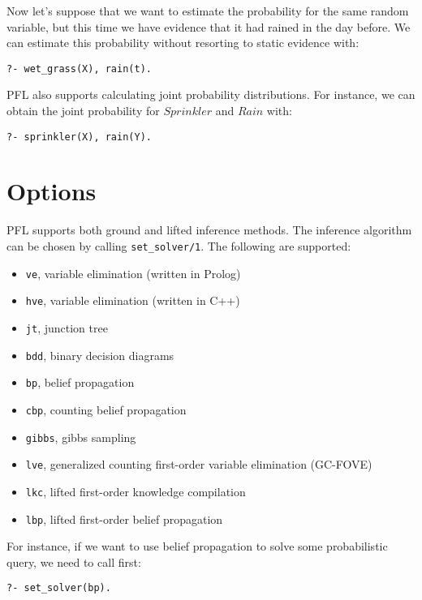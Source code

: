 \documentclass{article}
\begin{document}
Now let's suppose that we want to estimate the probability for the same random variable, but this time we have evidence that it had rained in the day before. We can estimate this probability without resorting to static evidence with:

\texttt{?- wet\_grass(X), rain(t).}

PFL also supports calculating joint probability distributions. For instance, we can obtain the joint probability for $Sprinkler$ and $Rain$ with:

\texttt{?- sprinkler(X), rain(Y).}



\section{Options}
PFL supports both ground and lifted inference methods. The inference algorithm can be chosen by calling \texttt{set\_solver/1}. The following are supported:
\begin{itemize}
 \item \texttt{ve},  variable elimination (written in Prolog)
 \item \texttt{hve}, variable elimination (written in C++)
 \item \texttt{jt},  junction tree
 \item \texttt{bdd}, binary decision diagrams
 \item \texttt{bp},  belief propagation
 \item \texttt{cbp}, counting belief propagation
 \item \texttt{gibbs}, gibbs sampling
 \item \texttt{lve}, generalized counting first-order variable elimination (GC-FOVE)
 \item \texttt{lkc}, lifted first-order knowledge compilation
 \item \texttt{lbp}, lifted first-order belief propagation
\end{itemize}

For instance, if we want to use belief propagation to solve some probabilistic query, we need to call first:

\texttt{?- set\_solver(bp).}
\end{document}
